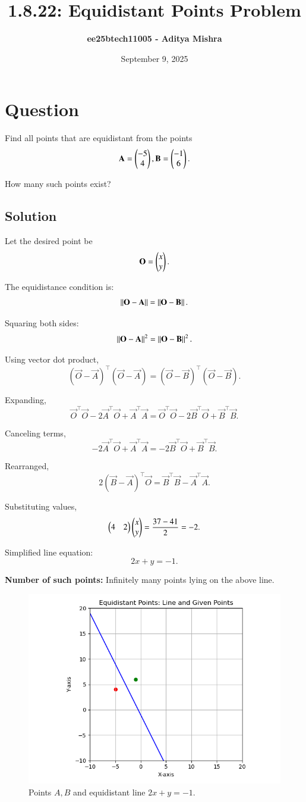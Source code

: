 \documentclass[12pt]{article}
\title{\textbf{1.8.22: Equidistant Points Problem}}
\author{\textbf{ee25btech11005 - Aditya Mishra}}
\date{September 9, 2025}
\begin{document}
\maketitle

\section*{Question}

Find all points that are equidistant from the points 
\[
\mathbf{A} = \begin{pmatrix}-5 \\ 4\end{pmatrix}, \mathbf{B} = \begin{pmatrix}-1 \\ 6\end{pmatrix}.
\]

How many such points exist?

\subsection*{Solution}

Let the desired point be 
\[
\mathbf{O} = \begin{pmatrix}x \\ y\end{pmatrix}.
\]

The equidistance condition is:
\[
\left\Vert \mathbf{O} - \mathbf{A} \right\Vert = \left\Vert \mathbf{O} - \mathbf{B} \right\Vert.
\]

Squaring both sides:
\[
\left\Vert \mathbf{O} - \mathbf{A} \right\Vert^2 = \left\Vert \mathbf{O} - \mathbf{B} \right\Vert^2.
\]

Using vector dot product,
\[
(\vec{O} - \vec{A})^\top (\vec{O} - \vec{A}) = (\vec{O} - \vec{B})^\top (\vec{O} - \vec{B}).
\]

Expanding,
\[
\vec{O}^\top \vec{O} - 2 \vec{A}^\top \vec{O} + \vec{A}^\top \vec{A} = \vec{O}^\top \vec{O} - 2 \vec{B}^\top \vec{O}+ \vec{B}^\top \vec{B}.
\]

Canceling terms,
\[
-2 \vec{A}^\top \vec{O} + \vec{A}^\top \vec{A} = -2 \vec{B}^\top \vec{O} + \vec{B}^\top \vec{B}.
\]

Rearranged,
\[
2 (\vec{B} - \vec{A})^\top \vec{O} = \vec{B}^\top \vec{B} - \vec{A}^\top \vec{A}.
\]

Substituting values,
\[
\begin{pmatrix}4 & 2\end{pmatrix} \begin{pmatrix}x \\ y\end{pmatrix} = \frac{37 - 41}{2} = -2.
\]

Simplified line equation:
\[
2x + y = -1.
\]

\textbf{Number of such points:} Infinitely many points lying on the above line.

\begin{figure}[h]
\centering
\includegraphics[width=0.8\columnwidth]{figs/equidistant_plot.png}
\caption{Points \(A, B\) and equidistant line \(2x + y = -1\).}
\label{fig:equidistant_plot}
\end{figure}
\end{document}
